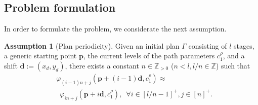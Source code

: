 \documentclass[letterpaper,10pt,conference]{ieeeconf}
\theoremstyle{definition}
\newtheorem{assm}[thm]{Assumption}
\begin{document}




\subsection{Problem formulation}

In order to formulate the problem, we considerate the next assumption.

\begin{assm}[Plan periodicity]\label{assm:periodic}
  Given an initial plan $\Gamma$ consisting of $l$ stages, a generic starting point $\mathbf{p}$, the current levels of the path parameters $c_1^\rho$, and a shift $\mathbf{d}:=(x_d,y_d)$, there exists a constant $n\in\mathbb{Z}_{>0}$ ($n<l,l/n\in\mathbb{Z}$) such that
  \begin{equation*}\begin{split}
    &\varphi_{(i-1)n+j}(\mathbf{p}+(i-1)\mathbf{d},c_1^\rho)\approx\\ &\,\,\,\varphi_{in+j}(\mathbf{p}+i\mathbf{d},c_1^\rho),\,\,\,\forall i\in[l/n-1]^+,j\in[n]^+.
  \end{split}\end{equation*}
\end{assm}
\end{document}
